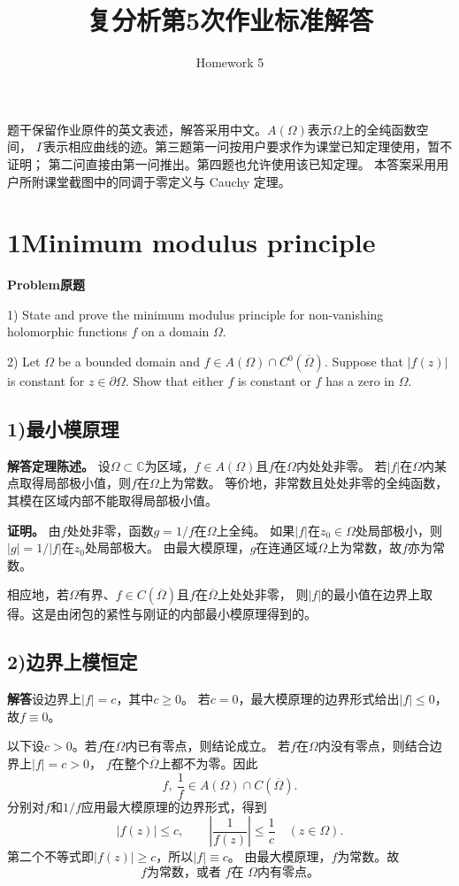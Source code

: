 \documentclass[11pt,a4paper]{ctexart}
\title{复分析第5次作业标准解答}
\author{}
\date{Homework 5}
\newcommand{\C}{\mathbb C}
\newcommand{\problem}{\par\textbf{Problem\quad 原题}\par}
\newcommand{\solution}{\par\medskip\textbf{解答}\quad}
\begin{document}
\maketitle
\vspace{-2em}
题干保留作业原件的英文表述，解答采用中文。$A(\Omega)$表示$\Omega$上的全纯函数空间，
$\Gamma$表示相应曲线的迹。第三题第一问按用户要求作为课堂已知定理使用，暂不证明；
第二问直接由第一问推出。第四题也允许使用该已知定理。
本答案采用用户所附课堂截图中的同调于零定义与 Cauchy 定理。

\section*{1\quad Minimum modulus principle}
\problem
1) State and prove the minimum modulus principle for non-vanishing holomorphic functions
$f$ on a domain $\Omega$.

2) Let $\Omega$ be a bounded domain and $f\in A(\Omega)\cap C^0(\overline\Omega)$.
Suppose that $|f(z)|$ is constant for $z\in\partial\Omega$.
Show that either $f$ is constant or $f$ has a zero in $\Omega$.

\subsection*{1)\quad 最小模原理}
\solution \textbf{定理陈述。}
设$\Omega\subset\C$为区域，$f\in A(\Omega)$且$f$在$\Omega$内处处非零。
若$|f|$在$\Omega$内某点取得局部极小值，则$f$在$\Omega$上为常数。
等价地，非常数且处处非零的全纯函数，其模在区域内部不能取得局部极小值。

\textbf{证明。}
由$f$处处非零，函数$g=1/f$在$\Omega$上全纯。
如果$|f|$在$z_0\in\Omega$处局部极小，则$|g|=1/|f|$在$z_0$处局部极大。
由最大模原理，$g$在连通区域$\Omega$上为常数，故$f$亦为常数。

相应地，若$\Omega$有界、$f\in C(\overline\Omega)$且$f$在$\overline\Omega$上处处非零，
则$|f|$的最小值在边界上取得。这是由闭包的紧性与刚证的内部最小模原理得到的。

\subsection*{2)\quad 边界上模恒定}
\solution 设边界上$|f|=c$，其中$c\ge0$。
若$c=0$，最大模原理的边界形式给出$|f|\le0$，故$f\equiv0$。

以下设$c>0$。若$f$在$\Omega$内已有零点，则结论成立。
若$f$在$\Omega$内没有零点，则结合边界上$|f|=c>0$，
$f$在整个$\overline\Omega$上都不为零。因此
\[
 f,\ \frac1f\in A(\Omega)\cap C(\overline\Omega).
\]
分别对$f$和$1/f$应用最大模原理的边界形式，得到
\[
 |f(z)|\le c,\qquad \left|\frac1{f(z)}\right|\le\frac1c
 \quad(z\in\Omega).
\]
第二个不等式即$|f(z)|\ge c$，所以$|f|\equiv c$。
由最大模原理，$f$为常数。故
\[
 \boxed{f\text{为常数，或者 }f\text{在 }\Omega\text{内有零点。}}
\]
\end{document}
